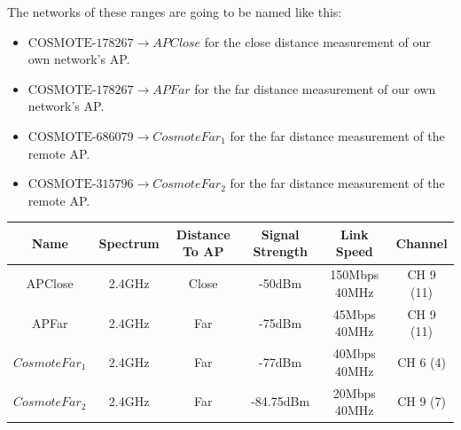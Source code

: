\documentclass{article}
\begin{document}
The networks of these ranges are going to be named like this: 

\begin{itemize}
    \item  $\text{COSMOTE-178267} \rightarrow APClose$ for the close distance measurement of our own network's AP.
    \item $\text{COSMOTE-178267} \rightarrow APFar$ for the far distance measurement of our own network's AP.
    \item $\text{COSMOTE-686079} \rightarrow CosmoteFar_1$ for the far distance measurement of the remote AP.
    \item $\text{COSMOTE-315796} \rightarrow CosmoteFar_2$ for the far distance measurement of the remote AP.
\end{itemize}

\begin{center}
\begin{tabular}{| c | c | c | c | c | c |}
    \hline
     Name & Spectrum & Distance To AP & Signal Strength & Link Speed & Channel \\
     \hline
     APClose &  2.4GHz & Close & -50dBm & 150Mbps 40MHz& CH 9 (11) \\
     \hline
     APFar &  2.4GHz & Far & -75dBm &  45Mbps 40MHz& CH 9 (11)\\
     \hline
     $CosmoteFar_1$&  2.4GHz & Far & -77dBm & 40Mbps  40MHz & CH 6 (4)\\
     \hline
     $CosmoteFar_2$&  2.4GHz & Far & -84.75dBm & 20Mbps  40MHz & CH 9 (7)\\
     \hline
\end{tabular} 
\end{center}
\end{document}
